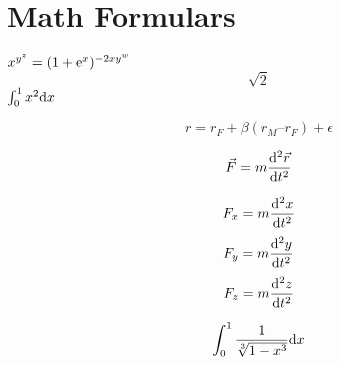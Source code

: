 \documentclass{article}        %
\begin{document}

\section{Math Formulars}          %

$x^{y^z}=(1+{\rm e}^x)^{-2xy^w}$
$$\sqrt{2}$$
$\int_0^1 x^2 {\rm d}x$

\[r = r_F+ \beta(r_M – r_F) + \epsilon\]

\begin{equation}\vec{F} = m \frac{{\rm d}^2 \vec{r}}{{\rm d}t^2}\end{equation}

\begin{equation}F_x = m \frac{{\rm d}^2x}{{\rm d}t^2}\end{equation}
\begin{equation}F_y = m \frac{{\rm d}^2y}{{\rm d}t^2}\end{equation}
\begin{equation}F_z = m \frac{{\rm d}^2z}{{\rm d}t^2}\end{equation}

$$\int_0^1 \frac{1}{\sqrt[3]{1-x^3}} {\rm d}x$$
\end{document}
